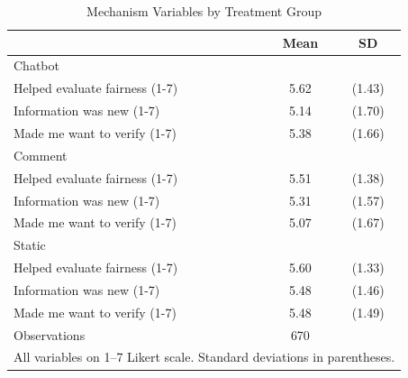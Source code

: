 \begin{table}[htbp]\centering
\caption{Mechanism Variables by Treatment Group}
\begin{tabular}{l*{1}{cc}}
\toprule
                    &        Mean&          SD\\
\midrule
Chatbot             &            &            \\
Helped evaluate fairness (1-7)&        5.62&      (1.43)\\
Information was new (1-7)&        5.14&      (1.70)\\
Made me want to verify (1-7)&        5.38&      (1.66)\\
\midrule
Comment             &            &            \\
Helped evaluate fairness (1-7)&        5.51&      (1.38)\\
Information was new (1-7)&        5.31&      (1.57)\\
Made me want to verify (1-7)&        5.07&      (1.67)\\
\midrule
Static              &            &            \\
Helped evaluate fairness (1-7)&        5.60&      (1.33)\\
Information was new (1-7)&        5.48&      (1.46)\\
Made me want to verify (1-7)&        5.48&      (1.49)\\
\midrule
Observations        &         670&            \\
\bottomrule
\multicolumn{3}{l}{\footnotesize All variables on 1--7 Likert scale. Standard deviations in parentheses.}\\
\end{tabular}
\end{table}
